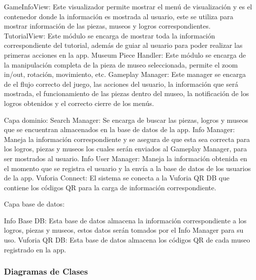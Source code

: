 \documentclass[12pt]{article}
\begin{document}
GameInfoView: Este visualizador permite mostrar el menú de visualización y es el contenedor donde la información es mostrada al usuario, este se utiliza para mostrar información de las piezas, museos y logros correspondientes.
TutorialView: Este módulo se encarga de mostrar toda la información correspondiente del tutorial, además de guiar al usuario para poder realizar las primeras acciones en la app.
Museum Piece Handler: Este módulo se encarga de la manipulación completa de la pieza de museo seleccionada, permite el zoom in/out, rotación, movimiento, etc.
Gameplay Manager:  Este manager se encarga de el flujo correcto del juego, las acciones del usuario, la información que será mostrada, el funcionamiento de las piezas dentro del museo, la notificación de los logros obtenidos y el correcto cierre de los menús.

Capa dominio:
Search Manager: Se encarga de buscar las piezas, logros y museos que se encuentran almacenados en la base de datos de la app.
Info Manager: Maneja la información correspondiente y se asegura de que esta sea correcta para  los logros, piezas y museos los cuales serán enviados al Gameplay Manager, para ser mostrados al usuario.
Info User Manager: Maneja la información obtenida en el momento que se registra el usuario y la envía a la base de datos de los usuarios de la app.
Vuforia Connect: El sistema se conecta a la Vuforia QR DB que contiene los códigos QR para la carga de información correspondiente.

Capa base de datos:

Info Base DB: Esta base de datos almacena la información correspondiente a los logros, piezas y museos, estos datos serán tomados por el Info Manager para su uso.
Vuforia QR DB: Esta base de datos almacena los códigos QR de cada museo registrado en la app. 


\subsubsection{Diagramas de Clases}
\end{document}
